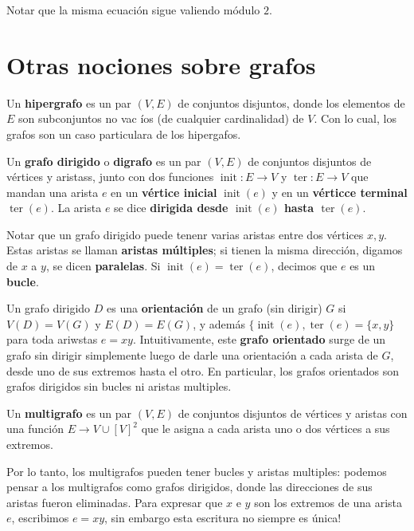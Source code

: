 \documentclass[../main.tex]{subfiles}
\begin{document}
Notar que la misma ecuación sigue valiendo módulo $2$.


\section[]{Otras nociones sobre grafos}

\begin{definition}
Un \textbf{hipergrafo} es un par $(V,E)$ de conjuntos disjuntos, donde los elementos de $E$ son subconjuntos no vac
íos (de cualquier cardinalidad) de $V$. Con lo cual, los grafos son un caso particulara de los hipergafos.
\end{definition}

\begin{definition}
    Un \textbf{grafo dirigido} o \textbf{digrafo} es un par $(V,E)$ de conjuntos disjuntos de vértices y aristass,
    junto con dos funciones $\operatorname{init}: E \rightarrow V$ y $\operatorname{ter} : E \rightarrow V$ que
    mandan una arista $e$ en un \textbf{vértice inicial} $\operatorname{init}(e)$ y en un \textbf{vérticce terminal} $\operatorname{ter}(e)$. La arista $e$ se dice \textbf{dirigida desde $\operatorname{init}(e)$ hasta $\operatorname{ter}(e)$}.
\end{definition}
Notar que un grafo dirigido puede tenenr varias aristas entre dos vértices $x,y$. Estas aristas se llaman \textbf{
aristas múltiples}; si tienen la misma dirección, digamos de $x$ a $y$, se dicen \textbf{paralelas}. Si $\operatorname{init}(e) = \operatorname{ter}(e)$, decimos que $e$ es un \textbf{bucle}.

Un grafo dirigido $D$ es una \textbf{orientación} de un grafo (sin dirigir) $G$ si $V(D) = V(G) $ y $E (D) = E(G)$, y
 además $\{ \operatorname{init}(e), \operatorname{ter}(e)= \{x,y\}$ para toda ariwstas $e = xy$. Intuitivamente, este \textbf{grafo orientado} surge de un grafo sin dirigir simplemente luego de darle una orientación a cada arista de $G$, desde uno de sus extremos hasta el otro. En particular, los grafos orientados son grafos dirigidos sin bucles ni aristas multiples.

 \begin{definition}
     Un \textbf{multigrafo} es un par $(V,E)$ de conjuntos disjuntos de vértices y aristas con una función $E \rightarrow V \cup [V]^2$ que le asigna a cada arista uno o dos vértices a sus extremos.
 \end{definition}
Por lo tanto, los multigrafos pueden tener bucles y aristas multiples: podemos pensar a los multigrafos como grafos
dirigidos, donde las direcciones de sus aristas fueron eliminadas. Para expresar que $x$ e $y$ son los extremos de
una arista $e$, escribimos $e = xy$, sin embargo esta escritura no siempre es única!
\end{document}

